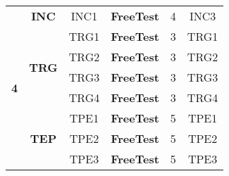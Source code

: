 \begin{table}[H]
{\begin{tabular}{|c|c|c|c|c|c|}
\multirow{9}{*}{\textbf{4}}                                                     & \textbf{INC}                  & INC1        & \textbf{FreeTest} & 4                                                                                  & INC3                                                                      \\ \cline{2-6} 
                                                                                & \multirow{4}{*}{\textbf{TRG}} & TRG1        & \textbf{FreeTest} & 3                                                                                  & TRG1                                                                      \\ \cline{3-6} 
                                                                                &                               & TRG2        & \textbf{FreeTest} & 3                                                                                  & TRG2                                                                      \\ \cline{3-6} 
                                                                                &                               & TRG3        & \textbf{FreeTest} & 3                                                                                  & TRG3                                                                      \\ \cline{3-6} 
                                                                                &                               & TRG4        & \textbf{FreeTest} & 3                                                                                  & TRG4                                                                      \\ \cline{2-6} 
                                                                                & \multirow{4}{*}{\textbf{TEP}} & TPE1        & \textbf{FreeTest} & 5                                                                                  & TPE1                                                                      \\ \cline{3-6} 
                                                                                &                               & TPE2        & \textbf{FreeTest} & 5                                                                                  & TPE2                                                                      \\ \cline{3-6} 
                                                                                &                               & TPE3        & \textbf{FreeTest} & 5                                                                                  & TPE3                                                                      \\ \cline{3-6} 

\end{tabular}}
\end{table}
